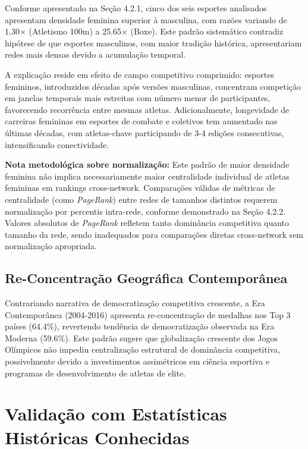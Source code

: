 Conforme apresentado na Seção 4.2.1, cinco dos seis esportes analisados apresentam densidade feminina superior à masculina, com razões variando de 1.30× (Atletismo 100m) a 25.65× (Boxe). Este padrão sistemático contradiz hipótese de que esportes masculinos, com maior tradição histórica, apresentariam redes mais densas devido a acumulação temporal.

A explicação reside em efeito de campo competitivo comprimido: esportes femininos, introduzidos décadas após versões masculinas, concentram competição em janelas temporais mais estreitas com número menor de participantes, favorecendo recorrência entre mesmas atletas. Adicionalmente, longevidade de carreiras femininas em esportes de combate e coletivos tem aumentado nas últimas décadas, com atletas-chave participando de 3-4 edições consecutivas, intensificando conectividade.

\textbf{Nota metodológica sobre normalização:} Este padrão de maior densidade feminina não implica necessariamente maior centralidade individual de atletas femininas em rankings cross-network. Comparações válidas de métricas de centralidade (como \textit{PageRank}) entre redes de tamanhos distintos requerem normalização por percentis intra-rede, conforme demonstrado na Seção 4.2.2. Valores absolutos de \textit{PageRank} refletem tanto dominância competitiva quanto tamanho da rede, sendo inadequados para comparações diretas cross-network sem normalização apropriada.

\subsection{Re-Concentração Geográfica Contemporânea}

Contrariando narrativa de democratização competitiva crescente, a Era Contemporânea (2004-2016) apresenta re-concentração de medalhas nos Top 3 países (64.4\%), revertendo tendência de democratização observada na Era Moderna (59.6\%). Este padrão sugere que globalização crescente dos Jogos Olímpicos não impediu centralização estrutural de dominância competitiva, possivelmente devido a investimentos assimétricos em ciência esportiva e programas de desenvolvimento de atletas de elite.

\section{Validação com Estatísticas Históricas Conhecidas}
\label{sec:validacao_historica}

